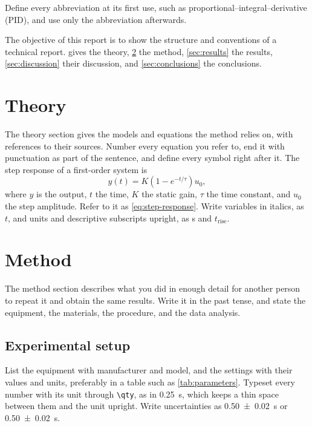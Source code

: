 \documentclass[10pt,a4paper,twocolumn]{article}
\begin{document}
Define every abbreviation at its first use, such as proportional--integral--derivative (PID), and use only the abbreviation afterwards.

The objective of this report is to show the structure and conventions of a technical report.
 gives the theory, \cref{sec:method} the method, \cref{sec:results} the results, \cref{sec:discussion} their discussion, and \cref{sec:conclusions} the conclusions.

\section{Theory}
\label{sec:theory}

The theory section gives the models and equations the method relies on, with references to their sources.
Number every equation you refer to, end it with punctuation as part of the sentence, and define every symbol right after it.
The step response of a first-order system is
\begin{equation}
  y(t) = K \left(1 - e^{-t/\tau}\right) u_0,
  \label{eq:step-response}
\end{equation}
where $y$ is the output, $t$ the time, $K$ the static gain, $\tau$ the time constant, and $u_0$ the step amplitude.
Refer to it as \cref{eq:step-response}.
Write variables in italics, as $t$, and units and descriptive subscripts upright, as \unit{\second} and $t_\mathrm{rise}$.

\section{Method}
\label{sec:method}

The method section describes what you did in enough detail for another person to repeat it and obtain the same results.
Write it in the past tense, and state the equipment, the materials, the procedure, and the data analysis.

\subsection{Experimental setup}
\label{sec:setup}

List the equipment with manufacturer and model, and the settings with their values and units, preferably in a table such as \cref{tab:parameters}.
Typeset every number with its unit through \verb|\qty|, as in \qty{0.25}{\second}, which keeps a thin space between them and the unit upright.
Write uncertainties as \qty{0.50(2)}{\second} or \qty{0.50 \pm 0.02}{\second}.
\end{document}
